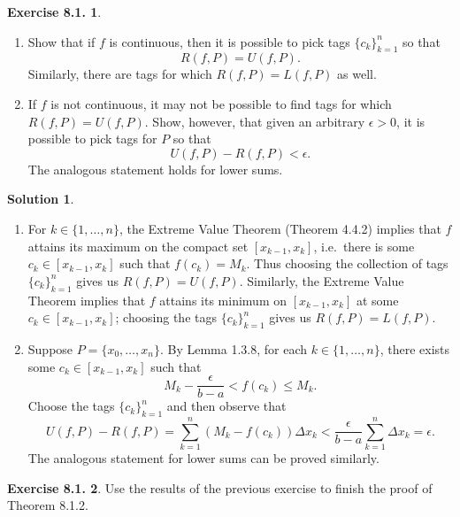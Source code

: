 \documentclass[12pt]{article}
\theoremstyle{definition}
\theoremstyle{exercise}
\newtheorem{exercise}{Exercise 8.1.}
\theoremstyle{solution}
\newtheorem*{solution}{Solution}
\begin{document}
\begin{exercise}
\label{ex:4}
    \begin{enumerate}
        \item Show that if \( f \) is continuous, then it is possible to pick tags \( \{ c_k \}_{k=1}^n \) so that
        \[
            R(f, P) = U(f, P).
        \]
        Similarly, there are tags for which \( R(f, P) = L(f, P) \) as well.

        \item If \( f \) is not continuous, it may not be possible to find tags for which \( R(f, P) = U(f, P) \). Show, however, that given an arbitrary \( \epsilon > 0 \), it is possible to pick tags for \( P \) so that
        \[
            U(f, P) - R(f, P) < \epsilon.
        \]
        The analogous statement holds for lower sums.
    \end{enumerate}
\end{exercise}

\begin{solution}
    \begin{enumerate}
        \item For \( k \in \{ 1, \ldots, n \} \), the Extreme Value Theorem (Theorem 4.4.2) implies that \( f \) attains its maximum on the compact set \( [x_{k-1}, x_k] \), i.e.\ there is some \( c_k \in [x_{k-1}, x_k] \) such that \( f(c_k) = M_k \). Thus choosing the collection of tags \( \{ c_k \}_{k=1}^n \) gives us \( R(f, P) = U(f, P) \). Similarly, the Extreme Value Theorem implies that \( f \) attains its minimum on \( [x_{k-1}, x_k] \) at some \( c_k \in [x_{k-1}, x_k] \); choosing the tags \( \{ c_k \}_{k=1}^n \) gives us \( R(f, P) = L(f, P) \).

        \item Suppose \( P = \{ x_0, \ldots, x_n \} \). By Lemma 1.3.8, for each \( k \in \{ 1, \ldots, n \} \), there exists some \( c_k \in [x_{k-1}, x_k] \) such that
        \[
            M_k - \frac{\epsilon}{b - a} < f(c_k) \leq M_k.
        \]
        Choose the tags \( \{ c_k \}_{k=1}^n \) and then observe that
        \[
            U(f, P) - R(f, P) = \sum_{k=1}^n (M_k - f(c_k)) \Delta x_k < \frac{\epsilon}{b - a} \sum_{k=1}^n \Delta x_k = \epsilon.
        \]
        The analogous statement for lower sums can be proved similarly.
    \end{enumerate}
\end{solution}

\begin{exercise}
\label{ex:5}
    Use the results of the previous exercise to finish the proof of Theorem 8.1.2.
\end{exercise}
\end{document}
